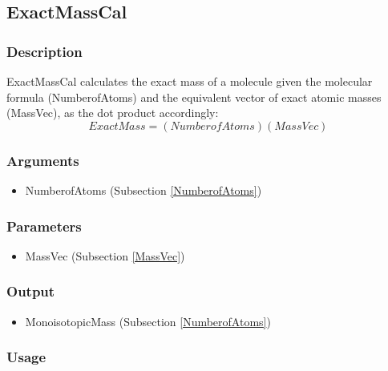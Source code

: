 \subsection{ExactMassCal}\label{ExactMassCal}
\subsubsection{Description}
ExactMassCal calculates the exact mass of a molecule given the molecular formula (NumberofAtoms) and the equivalent vector of exact atomic masses (MassVec), as the dot product accordingly:
\begin{equation}
ExactMass=\left(NumberofAtoms\right)\left(MassVec\right)
\end{equation}

\subsubsection{Arguments}
\begin{itemize}
\item NumberofAtoms (Subsection \ref{NumberofAtoms})
\end{itemize}

\subsubsection{Parameters}
\begin{itemize}
\item MassVec (Subsection \ref{MassVec})
\end{itemize}

\subsubsection{Output}
\begin{itemize}
\item MonoisotopicMass (Subsection \ref{NumberofAtoms})
\end{itemize}

\subsubsection{Usage}




